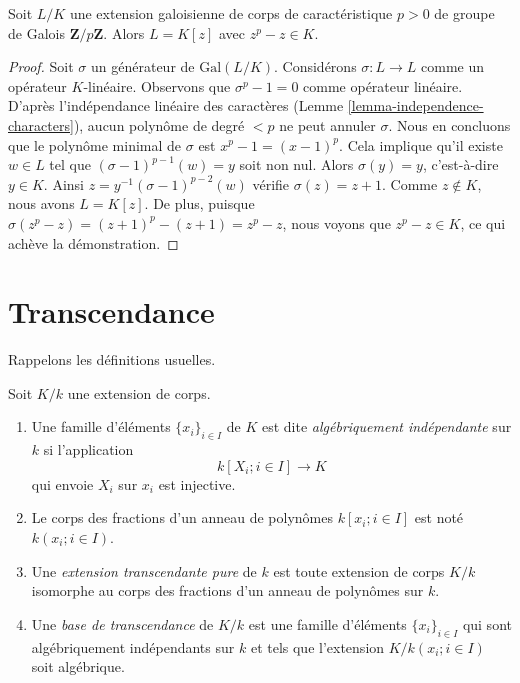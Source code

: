 \begin{lemma}
\label{lemma-Artin-Schreier}
Soit $L/K$ une extension galoisienne de corps de caractéristique $p > 0$
de groupe de Galois $\mathbf{Z}/p\mathbf{Z}$. Alors $L = K[z]$ avec
$z^p - z \in K$.
\end{lemma}

\begin{proof}
Soit $\sigma$ un générateur de $\text{Gal}(L/K)$.
Considérons $\sigma : L \to L$ comme un opérateur $K$-linéaire.
Observons que $\sigma^p - 1 = 0$ comme opérateur linéaire.
D'après l'indépendance linéaire des caractères
(Lemme \ref{lemma-independence-characters}),
aucun polynôme de degré $< p$ ne peut
annuler $\sigma$. Nous en concluons que le polynôme minimal
de $\sigma$ est $x^p - 1 = (x - 1)^p$.
Cela implique qu'il existe $w \in L$ tel que
$(\sigma - 1)^{p - 1}(w) = y$ soit non nul. Alors
$\sigma(y) = y$, c'est-à-dire $y \in K$. Ainsi
$z = y^{-1}(\sigma - 1)^{p - 2}(w)$ vérifie
$\sigma(z) = z + 1$. Comme $z \not \in K$, nous avons $L = K[z]$.
De plus, puisque $\sigma(z^p - z) = (z + 1)^p - (z + 1) = z^p - z$,
nous voyons que $z^p - z \in K$, ce qui achève la démonstration.
\end{proof}






\section{Transcendance}
\label{section-transcendence}

\noindent
Rappelons les définitions usuelles.

\begin{definition}
\label{definition-transcendence}
Soit $K/k$ une extension de corps.
\begin{enumerate}
\item Une famille d'éléments $\{x_i\}_{i \in I}$ de $K$ est dite
{\it algébriquement indépendante} sur $k$ si l'application
$$
k[X_i; i\in I] \longrightarrow K
$$
qui envoie $X_i$ sur $x_i$ est injective.
\item Le corps des fractions d'un anneau de polynômes
$k[x_i; i \in I]$ est noté $k(x_i; i\in I)$.
\item Une {\it extension transcendante pure} de $k$ est toute
extension de corps $K/k$ isomorphe au corps des
fractions d'un anneau de polynômes sur $k$.
\item Une {\it base de transcendance} de $K/k$ est une
famille d'éléments $\{x_i\}_{i \in I}$ qui sont
algébriquement indépendants sur $k$ et tels que
l'extension $K/k(x_i; i\in I)$ soit algébrique.
\end{enumerate}
\end{definition}

